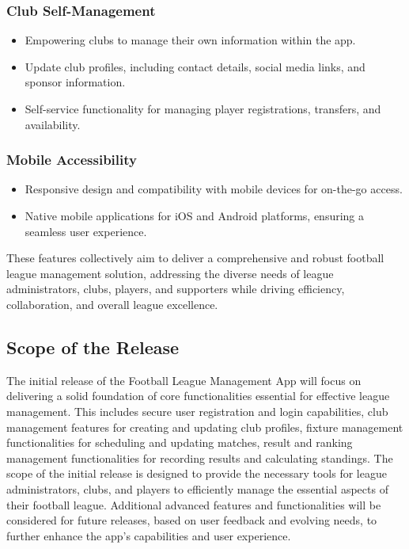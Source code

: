 \documentclass[12pt]{article}
\begin{document}
\subsubsection{Club Self-Management}
\begin{itemize}
    \item Empowering clubs to manage their own information within the app.
    \item Update club profiles, including contact details, social media links, and sponsor information.
    \item Self-service functionality for managing player registrations, transfers, and availability.
\end{itemize}

\subsubsection{Mobile Accessibility}
\begin{itemize}
    \item  Responsive design and compatibility with mobile devices for on-the-go access.
    \item Native mobile applications for iOS and Android platforms, ensuring a seamless user experience.
\end{itemize}

These features collectively aim to deliver a comprehensive and robust football league management solution, addressing the diverse needs of league administrators, clubs, players, and supporters while driving efficiency, collaboration, and overall league excellence.

\subsection{ Scope of the Release}
The initial release of the Football League Management App will focus on delivering a solid foundation of core functionalities essential for effective league management. This includes secure user registration and login capabilities, club management features for creating and updating club profiles, fixture management functionalities for scheduling and updating matches, result and ranking management functionalities for recording results and calculating standings. The scope of the initial release is designed to provide the necessary tools for league administrators, clubs, and players to efficiently manage the essential aspects of their football league. Additional advanced features and functionalities will be considered for future releases, based on user feedback and evolving needs, to further enhance the app's capabilities and user experience.
\end{document}
